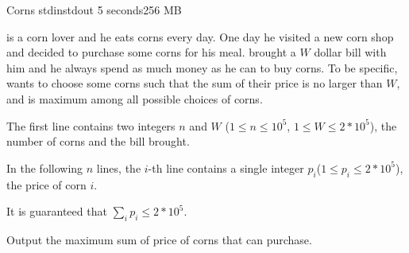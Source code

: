 \begin{problem}{Corns}
{stdin}{stdout}
{5 seconds}{256 MB}{}

\pittoresque is a corn lover and he eats corns every day. One day he visited a new corn shop and decided to purchase some corns for his meal. \pittoresque brought a $W$ dollar bill with him and he always spend as much money as he can to buy corns. To be specific, \pittoresque wants to choose some corns such that the sum of their price is no larger than $W$, and is maximum among all possible choices of corns.


\InputFile

The first line contains two integers $n$ and $W$ ($1 \le n \le 10^5$, $1 \le W \le 2 * 10^5$), the number of corns and the bill \pittoresque brought.

In the following $n$ lines, the $i$-th line contains a single integer $p_i$($1 \le p_i \le 2 * 10^5$), the price of corn $i$.

It is guaranteed that $\sum_i p_i \leq 2 * 10^5$.

\OutputFile

Output the maximum sum of price of corns that \pittoresque can purchase.

\Examples

\begin{example}
%
\end{example}

\begin{example}
%
\end{example}



\end{problem}
